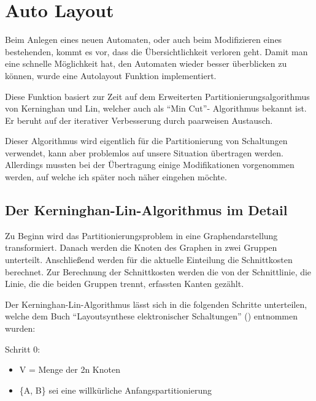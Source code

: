 

\chapter{Auto Layout}\label{AutoLayout}

Beim Anlegen eines neuen Automaten, oder auch beim Modifizieren eines
bestehenden, kommt es vor, dass die Übersichtlichkeit verloren geht. Damit man
eine schnelle Möglichkeit hat, den Automaten wieder besser überblicken zu
können, wurde eine Autolayout Funktion implementiert.\vspace{10pt}

Diese Funktion basiert zur Zeit auf dem Erweiterten Partitionierungsalgorithmus
von Kerninghan und Lin, welcher auch als "`Min Cut"'- Algorithmus
bekannt ist. Er beruht auf der iterativer Verbesserung durch paarweisen
Austausch.\vspace{10pt}

Dieser Algorithmus wird eigentlich für die Partitionierung von Schaltungen
verwendet, kann aber problemlos auf unsere Situation übertragen werden.
Allerdings mussten bei der Übertragung einige Modifikationen
vorgenommen werden, auf welche ich später noch näher eingehen
möchte.\vspace{10pt}

\section{Der Kerninghan-Lin-Algorithmus im Detail}\label{KerninghanLin}

Zu Beginn wird das Partitionierungsproblem in eine Graphendarstellung
transformiert. Danach werden die Knoten des Graphen in zwei Gruppen unterteilt.
Anschließend werden für die aktuelle Einteilung die Schnittkosten berechnet.
Zur Berechnung der Schnittkosten werden die von der Schnittlinie, die Linie, die
die beiden Gruppen trennt, erfassten Kanten gezählt.\vspace{10pt}

Der Kerninghan-Lin-Algorithmus lässt sich in die folgenden Schritte
unterteilen, welche dem Buch "`Layoutsynthese elektronischer
Schaltungen"' (\cite{Layout}) entnommen wurden:\vspace{10pt}

Schritt 0:
\begin{itemize}
  \item V = Menge der 2n Knoten 
  \item \{A, B\} sei eine willkürliche Anfangspartitionierung
\end{itemize}

